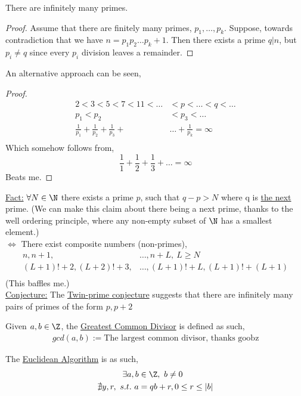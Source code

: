 \documentclass[../notes.tex]{subfiles}
\begin{document}
\begin{theorem}
    There are infinitely many primes.
\end{theorem}
\begin{proof}
    Assume that there are finitely many primes, $p_1,\dots,p_k$.
    Suppose, towards contradiction that we have $n=p_1p_2\dots p_k +1$.
    Then there exists a prime $q|n$, but $p_i\neq q$ since every $p_i$
    division leaves a remainder.
\end{proof}
An alternative approach can be seen,
\begin{proof}
    \begin{align*}
        2<3<5<7<11<\dots&<p<\dots<q<\dots\\
        p_1<p_2&<p_3<\dots\\
        \frac{1}{p_1}+ \frac{1}{p_2}+\frac{1}{p_3}+&\dots+
        \frac{1}{p_k}=\infty\\
    \end{align*}
    Which somehow follows from,
    \[
        \frac{1}{1}+ \frac{1}{2}+ \frac{1}{3}+\dots=\infty
    \]
    Beats me.
\end{proof}
\underline{Fact:} $\forall N\in \N$ there exists a prime $p$,
such that $q-p>N$ where q is \underline{the next} prime.
(We can make this claim about there being a next prime,
thanks to the well ordering principle, where any non-empty subset of 
$\N$ has a smallest element.)\\
$\iff$ There exist composite numbers (non-primes),
\begin{align*}
    n,n+1,&\dots,n+L,\ L\geq N\\
    (L+1)!+2,(L+2)!+3,&\dots,(L+1)!+L,(L+1)!+(L+1)\\
\end{align*}
(This baffles me.)\\
\vspace{.2cm}
\underline{Conjecture:} The \underline{Twin-prime conjecture} suggests that
there are infinitely many pairs of primes of the form $p,p+2$
\vspace{.2cm}
\begin{definition}
    Given $a,b\in \Z$, the \underline{Greatest Common Divisor} is defined
    as such,
    \begin{align*}
        gcd(a,b):= \text{The largest common divisor, thanks goobz}
    \end{align*}
\end{definition}
\vspace{.2cm}
The \underline{Euclidean Algorithm} is as such,
\begin{align*}
    \exists a,b&\in \Z,\ b\neq 0\\
    \nexists y, r,\ s.t.\ a&=qb+r,  0\leq r\leq |b|\\
\end{align*}
\end{document}
